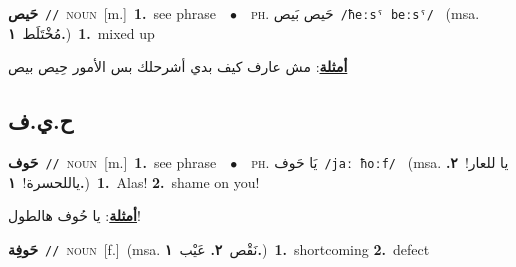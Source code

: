 \documentclass[10pt,a4paper,twoside]{article} %
\begin{document}
\begin{multicols}{2}
{\setlength\topsep{0pt}\textbf{\foreignlanguage{arabic}{حَيص}}\ {\color{gray}\texttt{//}\color{black}}\ \textsc{noun}\ [m.]\ \textbf{1.}~see phrase\ \ $\bullet$\ \ \textsc{ph.} \color{gray} \foreignlanguage{arabic}{حَيص بَيص}\color{black}\ {\color{gray}\texttt{/{\sffamily ħeːsˤ beːsˤ}/}\color{black}}\ \color{gray} (msa. \foreignlanguage{arabic}{مُخْتَلَط}~\foreignlanguage{arabic}{\textbf{١.}})\color{black}\ \textbf{1.}~mixed up\  \begin{flushright}\color{gray}\foreignlanguage{arabic}{\textbf{\underline{\foreignlanguage{arabic}{أمثلة}}}: مش عارف كيف بدي أشرحلك بس الأمور حِيص بيص}\end{flushright}\color{black}} \vspace{2mm}

\vspace{-3mm}
\subsection*{\color{blue}\foreignlanguage{arabic}{ح.ي.ف}\color{blue}{}} 

{\setlength\topsep{0pt}\textbf{\foreignlanguage{arabic}{حَوف}}\ {\color{gray}\texttt{//}\color{black}}\ \textsc{noun}\ [m.]\ \textbf{1.}~see phrase\ \ $\bullet$\ \ \textsc{ph.} \color{gray} \foreignlanguage{arabic}{يَا حَوف}\color{black}\ {\color{gray}\texttt{/{\sffamily jaː ħoːf}/}\color{black}}\ \color{gray} (msa. \foreignlanguage{arabic}{يا للعار!}~\foreignlanguage{arabic}{\textbf{٢.}}  \foreignlanguage{arabic}{ياللحسرة!}~\foreignlanguage{arabic}{\textbf{١.}})\color{black}\ \textbf{1.}~Alas!  \textbf{2.}~shame on you!\  \begin{flushright}\color{gray}\foreignlanguage{arabic}{\textbf{\underline{\foreignlanguage{arabic}{أمثلة}}}: يا حُوف هالطول!}\end{flushright}\color{black}} \vspace{2mm}

{\setlength\topsep{0pt}\textbf{\foreignlanguage{arabic}{حَوفِة}}\ {\color{gray}\texttt{//}\color{black}}\ \textsc{noun}\ [f.]\ \color{gray}(msa. \foreignlanguage{arabic}{نَقْص}~\foreignlanguage{arabic}{\textbf{٢.}}  \foreignlanguage{arabic}{عَيْب}~\foreignlanguage{arabic}{\textbf{١.}})\color{black}\ \textbf{1.}~shortcoming  \textbf{2.}~defect\ } \vspace{2mm}


\end{multicols}
\end{document}
